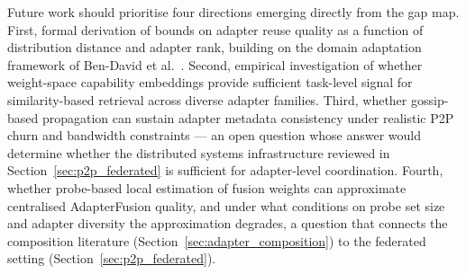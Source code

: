 Future work should prioritise four directions emerging directly from the gap
map. First, formal derivation of bounds on adapter reuse quality as a function 
of distribution distance and adapter rank, building on the domain adaptation 
framework of Ben-David et al.~\cite{BenDavid2010}. Second, empirical investigation of whether weight-space capability embeddings provide sufficient task-level signal for similarity-based retrieval across diverse adapter families.
Third, whether gossip-based propagation can sustain adapter metadata consistency under realistic P2P churn and bandwidth constraints — an open question whose answer would determine whether the distributed systems infrastructure reviewed in Section~\ref{sec:p2p_federated} is sufficient for adapter-level coordination. Fourth, whether probe-based local estimation of fusion weights can approximate centralised AdapterFusion quality, and under what conditions on probe set size and adapter diversity the approximation degrades, a question that connects the composition literature (Section~\ref{sec:adapter_composition}) to the federated setting (Section~\ref{sec:p2p_federated}).